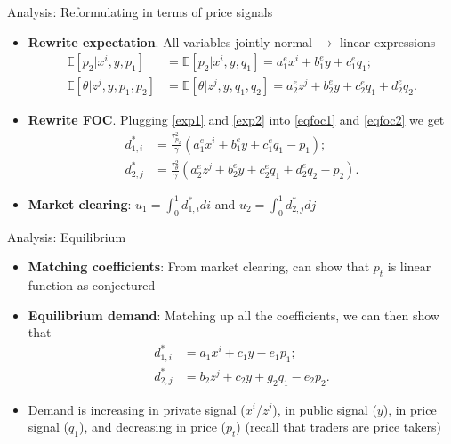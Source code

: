 \documentclass[english,10pt
,aspectratio=169
]{beamer}
\begin{document}
\begin{frame}{Analysis: Reformulating in terms of price signals}
	\begin{itemize}
		\item \textbf{Rewrite expectation}. All variables jointly normal $\rightarrow$ linear expressions
		\begin{align}
		\mathbb{E}[p_2| x^i, y, p_1] &=\mathbb{E}[p_2| x^i, y, q_1] = a^e_1 x^i+b^e_1 y +c^e_1 q_1;   \label{exp1} \\
		\mathbb{E}[\theta| z^j, y, p_1, p_2] &= \mathbb{E}[\theta| z^j, y, q_1, q_2] =  a^e_2 z^j+b^e_2 y +c^e_2 q_1 +d^e_2 q_2. \label{exp2}
		\end{align}
		\item \textbf{Rewrite FOC}. Plugging \eqref{exp1} and \eqref{exp2} into \eqref{eqfoc1} and \eqref{eqfoc2} we get
		\begin{align}
		d^*_{1,i} &= \frac{\tau^2_{p_2}}{\gamma}(a^e_1 x^i+b^e_1 y +c^e_1 q_1 - p_1); \label{eqfocb1} \\
		d^*_{2,j} &= \frac{\tau^2_\theta}{\gamma}(a^e_2 z^j+b^e_2 y +c^e_2 q_1 +d^e_2 q_2 - p_2). \label{eqfocb2}
		\end{align}
		\item \textbf{Market clearing}: $u_1=\int_0^1 d^*_{1,i} di$ and $u_2=\int_0^1 d^*_{2,j} dj$
	\end{itemize}
\end{frame}


\begin{frame}{Analysis: Equilibrium}
	\begin{itemize}
		\item \textbf{Matching coefficients}: From market clearing, can show that $p_t$ is linear function as conjectured
		\item \textbf{Equilibrium demand}: Matching up all the coefficients, we can then show that
		\begin{align}
		d^*_{1,i} &=  a_1 x^i+c_1 y -e_1 p_1; \label{eqdem1} \\
		d^*_{2,j} &= b_2 z^j+c_2 y + g_2q_1-e_2 p_2. \label{eqdem2}
		\end{align} 
		\item Demand is increasing in private signal ($x^i$/$z^j$), in public signal ($y$), in price signal ($q_1$), and decreasing in price ($p_t$) 
		(recall that traders are price takers)
	\end{itemize}
\end{frame}
\end{document}
